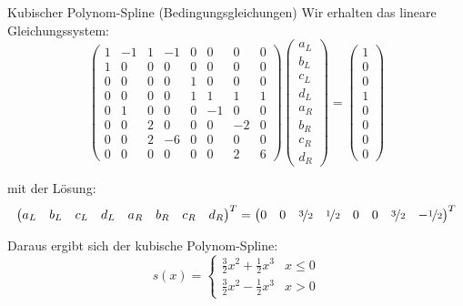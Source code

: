\begin{example}{Kubischer Polynom-Spline (Bedingungsgleichungen)}
    Wir erhalten das lineare Gleichungssystem: 
    \[ 
        \begin{pmatrix}
            1 & -1 & 1 & -1 & 0 & 0  & 0  & 0  \\ 
            1 & 0  & 0 & 0  & 0 & 0  & 0  & 0  \\
            0 & 0  & 0 & 0  & 1 & 0  & 0  & 0  \\
            0 & 0  & 0 & 0  & 1 & 1  & 1  & 1  \\
            0 & 1  & 0 & 0  & 0 & -1 & 0  & 0  \\
            0 & 0  & 2 & 0  & 0 & 0  & -2 & 0  \\
            0 & 0  & 2 & -6 & 0 & 0  & 0  & 0  \\
            0 & 0  & 0 & 0  & 0 & 0  & 2  & 6 
        \end{pmatrix}
        \begin{pmatrix}
            a_L \\
            b_L \\
            c_L \\
            d_L \\
            a_R \\
            b_R \\
            c_R \\
            d_R
        \end{pmatrix}
        = 
        \begin{pmatrix}
            1 \\
            0 \\
            0 \\
            1 \\
            0 \\
            0 \\
            0 \\
            0
        \end{pmatrix}
    \]
    
    mit der Lösung: 
    \[ 
        \begin{pmatrix}
            a_L & b_L & c_L & d_L & a_R & b_R & c_R & d_R
        \end{pmatrix}^T
        = 
        \begin{pmatrix}
            0 & 0 & \nicefrac{3}{2} & \nicefrac{1}{2} & 0 & 0 & \nicefrac{3}{2} & -\nicefrac{1}{2}
        \end{pmatrix}^T
    \]
    
    Daraus ergibt sich der kubische Polynom-Spline:
    \[ 
        s(x) = 
        \begin{cases}
            \frac{3}{2} x^2 + \frac{1}{2} x^3 & x \leq 0 \\ 
            \frac{3}{2} x^2 - \frac{1}{2} x^3 & x > 0
        \end{cases}
    \]
\end{example}

